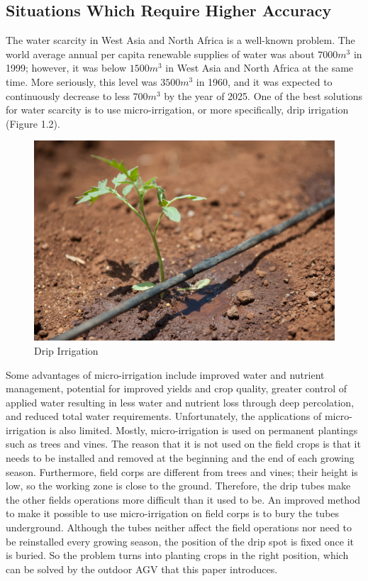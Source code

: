 \subsection{Situations Which Require Higher Accuracy}
The water scarcity in West Asia and North Africa is a well-known problem. The world average annual per capita renewable supplies of water was about $7000 m^{3}$ in 1999; however, it was below $1500 m^{3}$ in West Asia and North Africa at the same time. More seriously, this level was $3500 m^{3}$ in 1960, and it was expected to continuously decrease to less $700 m^{3}$ by the year of 2025. \cite{margat1999water} One of the best solutions for water scarcity is to use micro-irrigation, or more specifically, drip irrigation (Figure 1.2). 
\begin{figure}[ht!]
\begin{center}
\includegraphics[scale = 0.2]{pics/drip.jpg}
\caption{Drip Irrigation}
\end{center}
\end{figure}
Some advantages of micro-irrigation include improved water and nutrient management, potential for improved yields and crop quality, greater control of applied water resulting in less water and nutrient loss through deep percolation, and reduced total water requirements. \cite{phene1986advantages} Unfortunately, the applications of micro-irrigation is also limited. Mostly, micro-irrigation is used on permanent plantings such as trees and vines. The reason that it is not used on the field crops is that it needs to be installed and removed at the beginning and the end of each growing season. Furthermore, field corps are different from trees and vines; their height is low, so the working zone is close to the ground. Therefore, the drip tubes make the other fields operations more difficult than it used to be. An improved method to make it possible to use micro-irrigation on field corps is to bury the tubes underground. \cite{camp1998subsurface} Although the tubes neither affect the field operations nor need to be reinstalled every growing season, the position of the drip spot is fixed once it is buried. So the problem turns into planting crops in the right position, which can be solved by the outdoor AGV that this paper introduces. 

